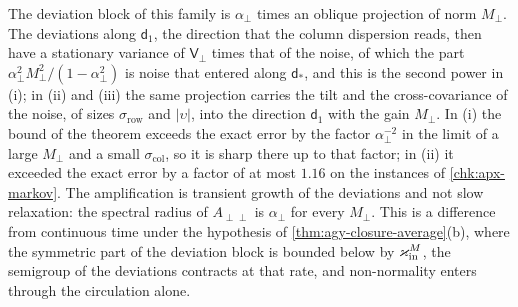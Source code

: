 The deviation block of this family is $\alpha_\perp$ times an oblique projection of norm $M_\perp$. The deviations along $\mathsf d_1$, the direction that the column dispersion reads, then have a stationary variance of $\mathsf V_\perp$ times that of the noise, of which the part $\alpha_\perp^2M_\perp^2/(1-\alpha_\perp^2)$ is noise that entered along $\mathsf d_\ast$, and this is the second power in (i); in (ii) and (iii) the same projection carries the tilt and the cross-covariance of the noise, of sizes $\sigma_{\mathrm{row}}$ and $\lvert\upsilon\rvert$, into the direction $\mathsf d_1$ with the gain $M_\perp$. In (i) the bound of the theorem exceeds the exact error by the factor $\alpha_\perp^{-2}$ in the limit of a large $M_\perp$ and a small $\sigma_{\mathrm{col}}$, so it is sharp there up to that factor; in (ii) it exceeded the exact error by a factor of at most $1.16$ on the instances of \cref{chk:apx-markov}. The amplification is transient growth of the deviations and not slow relaxation: the spectral radius of $A_{\perp\perp}$ is $\alpha_\perp$ for every $M_\perp$. This is a difference from continuous time under the hypothesis of \cref{thm:agy-closure-average}(b), where the symmetric part of the deviation block is bounded below by $\varkappa_{\mathrm{in}}^M$, the semigroup of the deviations contracts at that rate, and non-normality enters through the circulation alone.

